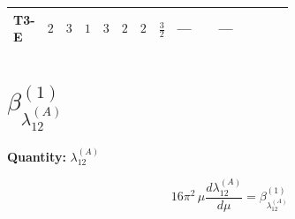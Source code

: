 \documentclass[8pt]{article}
\begin{document}
\begin{landscape}
\begin{longtable}{@{}llcccccc >{\raggedright\arraybackslash}p{0.21\linewidth} >{\raggedright\arraybackslash}p{0.21\linewidth} >{\raggedright\arraybackslash}p{0.21\linewidth}@{}}
\midrule
T3-E & $2$ & $3$ & $1$ & $3$ & $2$ & $2$ & $\frac{3}{2}$ & --- & --- & \scriptsize\adjustbox{max width=\linewidth}{$\begin{gathered} {\lambda_5} \left(T_{\nu}^{(1)}+T_{\nu}^{(2)}+6 \operatorname{Tr}\!\left({Y_d}\,\left({Y_d}\right)^{\dagger}\right)+2 \operatorname{Tr}\!\left({Y_e}\,\left({Y_e}\right)^{\dagger}\right)+6 \operatorname{Tr}\!\left({Y_u}\,\left({Y_u}\right)^{\dagger}\right)-\frac{4 {\lambda_{12}^{(A)}}}{3}-2 {\lambda_{12}^{(\times)}}-2 {\lambda_{HS_1}^{(A)}}-\frac{4 {\lambda_{HS_2}^{(A)}}}{3}\right)\end{gathered}$} \\
\midrule
\bottomrule
\end{longtable}
\clearpage
\section*{$\beta_{\lambda_{12}^{(A)}}^{(1)}$}
\noindent\textbf{Quantity: }$\lambda_{12}^{(A)}$\par\smallskip
\[16\pi^2\,\mu\frac{d \lambda_{12}^{(A)}}{d\mu}=\beta_{\lambda_{12}^{(A)}}^{(1)}\]

\end{landscape}
\end{document}
